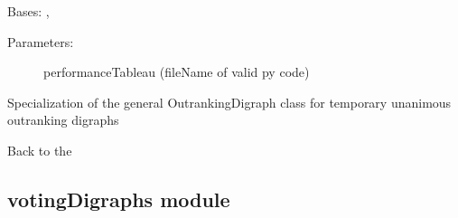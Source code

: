 \documentclass[letterpaper,10pt,english]{sphinxmanual}
\begin{document}

\begin{fulllineitems}
\label{techDoc:outrankingDigraphs.UnanimousOutrankingDigraph}
Bases: {\hyperref[techDoc:outrankingDigraphs.OutrankingDigraph]{\emph{}}}, {\hyperref[techDoc:perfTabs.PerformanceTableau]{\emph{}}}
\begin{description}
\item[{Parameters:}] \leavevmode
performanceTableau (fileName of valid py code)

\end{description}

Specialization of the general OutrankingDigraph class for 
temporary unanimous outranking digraphs

\end{fulllineitems}


Back to the {\hyperref[techDoc:technical-label]{\emph{}}}


\subsection{votingDigraphs module}
\label{techDoc:votingdigraphs-module}\label{techDoc:module-votingDigraphs}\label{techDoc:votingdigraphs-label}
\end{document}
